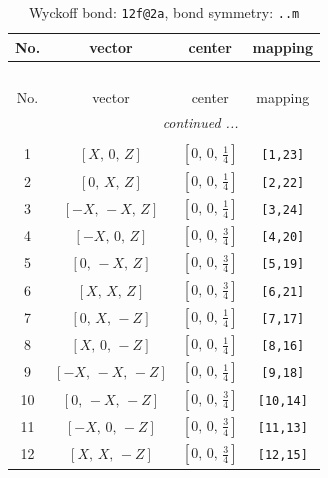 \documentclass[fleqn,8pt]{jsarticle}
\begin{document}
\renewcommand{\arraystretch}{1.2}
\begin{longtable}{cccc}
\caption{Wyckoff bond: {\tt 12f@2a}, bond symmetry: {\tt ..m}}
 \\
 \hline \hline
No. & vector & center & mapping \\ \hline \endfirsthead

\multicolumn{3}{l}{\tablename\ \thetable{}} \\
 \hline \hline
No. & vector & center & mapping \\ \hline \endhead

 \hline \hline
\multicolumn{3}{r}{\footnotesize\it continued ...} \\ \endfoot

 \hline \hline
\multicolumn{3}{r}{} \\ \endlastfoot

1 & $\left[ X,\, 0,\, Z \right]$ & $\left[ 0,\, 0,\, \frac{1}{4} \right]$ & {\tt [1,23]} \\ \hline
2 & $\left[ 0,\, X,\, Z \right]$ & $\left[ 0,\, 0,\, \frac{1}{4} \right]$ & {\tt [2,22]} \\ \hline
3 & $\left[ - X,\, - X,\, Z \right]$ & $\left[ 0,\, 0,\, \frac{1}{4} \right]$ & {\tt [3,24]} \\ \hline
4 & $\left[ - X,\, 0,\, Z \right]$ & $\left[ 0,\, 0,\, \frac{3}{4} \right]$ & {\tt [4,20]} \\ \hline
5 & $\left[ 0,\, - X,\, Z \right]$ & $\left[ 0,\, 0,\, \frac{3}{4} \right]$ & {\tt [5,19]} \\ \hline
6 & $\left[ X,\, X,\, Z \right]$ & $\left[ 0,\, 0,\, \frac{3}{4} \right]$ & {\tt [6,21]} \\ \hline
7 & $\left[ 0,\, X,\, - Z \right]$ & $\left[ 0,\, 0,\, \frac{1}{4} \right]$ & {\tt [7,17]} \\ \hline
8 & $\left[ X,\, 0,\, - Z \right]$ & $\left[ 0,\, 0,\, \frac{1}{4} \right]$ & {\tt [8,16]} \\ \hline
9 & $\left[ - X,\, - X,\, - Z \right]$ & $\left[ 0,\, 0,\, \frac{1}{4} \right]$ & {\tt [9,18]} \\ \hline
10 & $\left[ 0,\, - X,\, - Z \right]$ & $\left[ 0,\, 0,\, \frac{3}{4} \right]$ & {\tt [10,14]} \\ \hline
11 & $\left[ - X,\, 0,\, - Z \right]$ & $\left[ 0,\, 0,\, \frac{3}{4} \right]$ & {\tt [11,13]} \\ \hline
12 & $\left[ X,\, X,\, - Z \right]$ & $\left[ 0,\, 0,\, \frac{3}{4} \right]$ & {\tt [12,15]} \\
\end{longtable}
\end{document}

